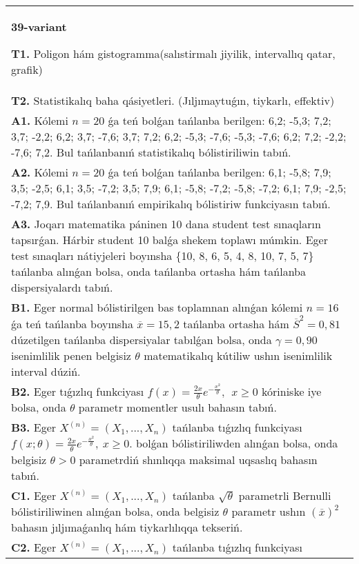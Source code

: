 \documentclass{article}
\begin{document}
\begin{tabular}{m{17cm}}
\textbf{39-variant}
\newline

\textbf{T1.} 
Poligon hám gistogramma(salıstirmalı jiyilik, intervallıq qatar, grafik)
 \\
\textbf{T2.} 
Statistikalıq baha qásiyetleri. (Jıljımaytuǵın, tiykarlı, effektiv)
 \\
\textbf{A1.} 
Kólemi \(n = 20\) ǵa teń bolǵan tańlanba berilgen: 6,2; -5,3; 7,2; 3,7; -2,2; 6,2; 3,7; -7,6; 3,7; 7,2; 6,2; -5,3; -7,6; -5,3; -7,6; 6,2; 7,2; -2,2; -7,6; 7,2. Bul tańlanbanıń statistikalıq bólistiriliwin tabıń.
 \\
\textbf{A2.} 
Kólemi \(n = 20\) ǵa teń bolǵan tańlanba berilgen: 6,1; -5,8; 7,9; 3,5; -2,5; 6,1; 3,5; -7,2; 3,5; 7,9; 6,1; -5,8; -7,2; -5,8; -7,2; 6,1; 7,9; -2,5; -7,2; 7,9. Bul tańlanbanıń empirikalıq bólistiriw funkciyasın tabıń.
 \\
\textbf{A3.} 
Joqarı matematika páninen 10 dana student test sınaqların tapsırǵan. Hárbir student 10 balǵa shekem toplawı múmkin. Eger test sınaqları nátiyjeleri boyınsha \{10, 8, 6, 5, 4, 8, 10, 7, 5, 7\} tańlanba alınǵan bolsa, onda tańlanba ortasha hám tańlanba dispersiyalardı tabıń.
 \\
\textbf{B1.} 
Eger normal bólistirilgen bas toplamnan alınǵan kólemi \(n = 16\) ǵa teń tańlanba boyınsha \(\overline{x} = 15,2\) tańlanba ortasha hám \({\overline{S}}^{2} = 0,81\) dúzetilgen tańlanba dispersiyalar tabılǵan bolsa, onda \(\gamma = 0,90\) isenimlilik penen belgisiz \(\theta\) matematikalıq kútiliw ushın isenimlilik interval dúziń.
 \\
\textbf{B2.} 
Eger tıǵızlıq funkciyası \(f(x) = \frac{2x}{\theta}e^{- \frac{x^{2}}{\theta}},\ \ x \geq 0\) kóriniske iye bolsa, onda \(\theta\) parametr momentler usulı bahasın tabıń.
 \\
\textbf{B3.} 
Eger \(X^{(n)} = \left( X_{1},...,X_{n} \right)\) tańlanba tıǵızlıq funkciyası \(f(x;\theta) = \frac{2x}{\theta}e^{- \frac{x^{2}}{\theta}},\ x \geq 0\). bolǵan bólistiriliwden alınǵan bolsa, onda belgisiz \(\theta > 0\) parametrdiń shınlıqqa maksimal uqsaslıq bahasın tabıń.
 \\
\textbf{C1.} 
Eger \(X^{(n)} = \left( X_{1},...,X_{n} \right)\) tańlanba \(\sqrt{\theta}\) parametrli Bernulli bólistiriliwinen alınǵan bolsa, onda belgisiz \(\theta\) parametr ushın \((\overline{x})^{2}\) bahasın jıljımaǵanlıq hám tiykarlılıqqa tekseriń.
 \\
\textbf{C2.} 
Eger \(X^{(n)} = \left( X_{1},...,X_{n} \right)\) tańlanba tıǵızlıq funkciyası

\end{tabular}
\end{document}
